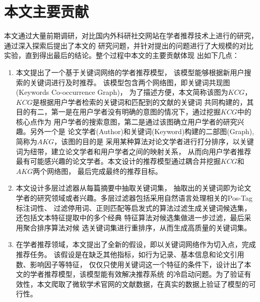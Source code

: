 \section{本文主要贡献}
本文通过大量前期调研，对比国内外科研社交网站在学者推荐技术上进行的研究，通过深入探索后提出了本文的%
研究问题，并针对提出的问题进行了大规模的对比实验，直到得出最后的结论。整个过程中本文的主要贡献体现%
出如下几点：
\begin{enumerate}
\item 本文提出了一个基于关键词网络的学者推荐模型，%
该模型能够根据新用户搜索的关键词进行及时推荐。%
该模型包含两个网络图，即关键词共现图(Keywords Co-occurrence Graph)，%
为了描述方便，本文简称该图为$KCG$，$KCG$是根据用户学者检索的关键词和匹配到的文献的关键词%
共同构建的，其目的有二，第一是在用户学者没有明确的意图的情况下，通过挖掘$KCG$中的核心点作为%
用户学者的搜索意图，第二是通过该图确立用户学者的研究兴趣。另外一个是
论文学者(Author)和关键词(Keyword)构建的二部图(Graph),简称为$AKG$，该图的目的是%
采用某种算法对论文学者进行打分排序，以关键词为纽带，建立论文学者和用户学者之间的映射关系，%
从而向用户学者推荐最有可能感兴趣的论文学者。本文设计的推荐模型通过耦合并挖掘$KCG$和$AKG$两个网络图，%
最后完成最终的推荐目标。
\item 本文设计多层过滤器从每篇摘要中抽取关键词集，%
抽取出的关键词即为论文学者的研究领域或者兴趣。多层过滤器包括采用自然语言处理相关的Pos-Tag标注词性、%
过滤停用词、正则匹配等启发式的算法过滤生成关键词候选集，还包括文本特征提取中的多个经典%
特征算法对候选集做进一步过滤，最后采用聚合排序算法对候%
选关键词集进行重排序，从而生成高质量的关键词集。%
\item 在学者推荐领域，本文提出了全新的假设，即以关键词网络作为切入点，完成推荐任务。%
该假设是在缺乏其他指标，如行为记录、基本信息和论文引用数、影响因子等特征，%
仅仅只使用关键词这一个特征的条件下，设计出了本文的学者推荐模型，该模型能有效解决推荐系统%
的冷启动问题。为了验证有效性，本文爬取了微软学术官网的文献数据，在真实的数据上验证了模型的可行性。

\end{enumerate}




